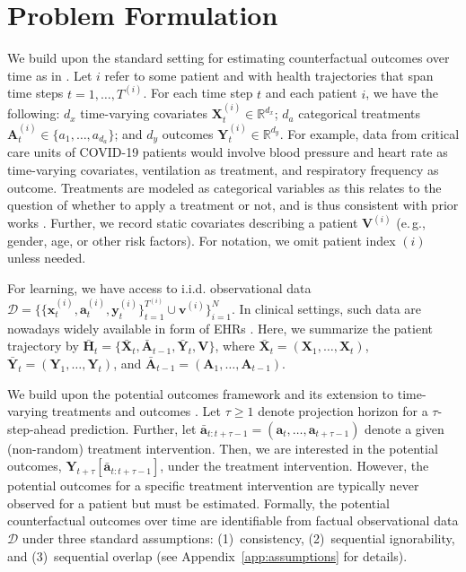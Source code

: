 \documentclass{article}
\newcommand\eg{e.\,g.\xspace}
\theoremstyle{plain}
\theoremstyle{definition}
\theoremstyle{remark}
\begin{document}
\section{Problem Formulation} 
\label{sec:problem-formulation}


We build upon the standard setting for estimating counterfactual outcomes over time as in \cite{robins2009estimation,lim2018forecasting,bica2020estimating,li2021g}. Let $i$ refer to some patient and with health trajectories that span time steps $t = 1, \dots, T^{(i)}$. For each time step $t$ and each patient $i$, we have the following: $d_x$ time-varying covariates $\mathbf{X}_{t}^{(i)} \in \mathbb{R}^{d_x}$; $d_a$ categorical treatments $\mathbf{A}_{t}^{(i)} \in \{a_1, \dots, a_{d_a}\}$; and $d_y$ outcomes $\mathbf{Y}_{t}^{(i)} \in \mathbb{R}^{d_y}$. For example, data from critical care units of COVID-19 patients would involve blood pressure and heart rate as time-varying covariates, ventilation as treatment, and respiratory frequency as outcome. Treatments are modeled as categorical variables as this relates to the question of whether to apply a treatment or not, and is thus consistent with prior works \cite{lim2018forecasting,bica2020estimating,li2021g}. Further, we record static covariates describing a patient $\mathbf{V}^{(i)}$ (\eg, gender, age, or other risk factors). For notation, we omit patient index $(i)$ unless needed.  

For learning, we have access to i.i.d. observational data $\mathcal{D} = \big\{ \{\mathbf{x}_{t}^{(i)}, \mathbf{a}_{t}^{(i)}, \mathbf{y}_{t}^{(i)}\}_{t=1}^{T^{(i)}} \cup \mathbf{v}^{(i)} \big\}_{i=1}^N$. In clinical settings, such data are nowadays widely available in form of EHRs \cite{allam2021analyzing}. Here, we summarize the patient trajectory by $\bar{\mathbf{H}}_{t} = \{ \bar{\mathbf{X}}_{t}, \bar{\mathbf{A}}_{t-1}, \bar{\mathbf{Y}}_{t}, \mathbf{V} \}$, where $\bar{\mathbf{X}}_{t} = (\mathbf{X}_1, \dots, \mathbf{X}_t)$, $\bar{\mathbf{Y}}_{t} = (\mathbf{Y}_1, \dots, \mathbf{Y}_t)$, and $\bar{\mathbf{A}}_{t-1} = (\mathbf{A}_1, \dots, \mathbf{A}_{t-1})$.


We build upon the potential outcomes framework \cite{neyman1923application,rubin1978bayesian} and its extension to time-varying treatments and outcomes \cite{robins2009estimation}. Let $\tau \geq 1$ denote projection horizon for a $\tau$-step-ahead prediction. Further,
let $\bar{\mathbf{a}} _{t: t+\tau-1} = (\mathbf{a}_t, \ldots, \mathbf{a}_{t + \tau - 1})$ 
denote a given (non-random) treatment intervention. Then, we are interested in the potential outcomes, $\mathbf{Y}_{t + \tau}[\bar{\mathbf{a}}_{t: t+\tau-1}]$, under the treatment intervention. However, the potential outcomes for a specific treatment intervention are typically never observed for a patient but must be estimated. Formally, the potential counterfactual outcomes over time are identifiable from factual observational data $\mathcal{D}$ under three standard assumptions: (1)~consistency, (2)~sequential ignorability, and (3)~sequential overlap (see Appendix~\ref{app:assumptions} for details). 
\end{document}
